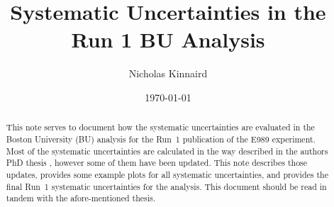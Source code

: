 \documentclass[12pt,letterpaper]{article}
\title{Systematic Uncertainties in the Run 1 BU \wa Analysis}
\author{Nicholas Kinnaird}
\date{\today}
\begin{document}
\maketitle

\begin{abstract}
	This note serves to document how the systematic uncertainties are evaluated in the Boston University (BU) analysis for the Run~1 publication of the E989 experiment. Most of the systematic uncertainties are calculated in the way described in the authors PhD thesis \cite{phdthesis:2020Kinnaird}, however some of them have been updated. This note describes those updates, provides some example plots for all systematic uncertainties, and provides the final Run~1 systematic uncertainties for the analysis. This document should be read in tandem with the afore-mentioned thesis.
\end{abstract}

\tableofcontents












{}
\printbibliography

\end{document}
